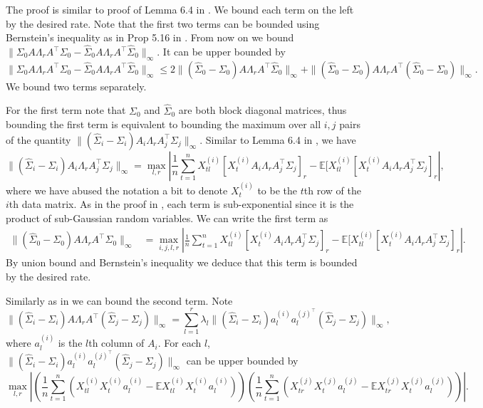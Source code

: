 \documentclass[11pt]{article}
\newcommand{\so}{\widehat{\Sigma}_0}
\newcommand{\0}{{\mathbf{0}}}
\begin{document}
\iffalse
The proof is similar to proof of Lemma 6.4 in \cite{gao2017sparse}. We bound each term on the left by the desired rate. Note that the first two terms can be bounded using Bernstein's inequality as in Prop 5.16 in \cite{vershynin2010introduction}. From now on we bound $\|\Sigma_0A\Lambda_rA^\top\Sigma_0-\so A\Lambda_r A^\top\so\|_\infty.$ It can be upper bounded by
\begin{equation*}
\|\Sigma_0A\Lambda_rA^\top\Sigma_0-\so A\Lambda_r A^\top\so\|_\infty\leq 2\|(\so-\Sigma_0)A\Lambda_rA^\top\so\|_\infty+\|(\so-\Sigma_0)A\Lambda_rA^\top(\so-\Sigma_0)\|_\infty.
\end{equation*}
We bound two terms separately. 
\par For the first term note that $\Sigma_0$ and $\widehat{\Sigma}_0$ are both block diagonal matrices, thus bounding the first term is equivalent to bounding the maximum over all $i,j$ pairs of the quantity $ \|(\widehat{\Sigma}_i-\Sigma_i)A_i\Lambda_rA_j^\top  \Sigma_j\|_\infty$. Similar to Lemma 6.4 in \cite{gao2017sparse}, we have \begin{equation*}
    \|(\widehat{\Sigma}_i-\Sigma_i)A_i\Lambda_rA_j^\top  \Sigma_j\|_\infty=\max_{l,r}|\frac{1}{n}\sum_{t=1}^n X_{tl}^{(i)}[X^{(i)}_tA_i\Lambda_rA_j^\top  \Sigma_j]_r-\mathbb{E}[ X_{tl}^{(i)}[X^{(i)}_tA_i\Lambda_rA_j^\top  \Sigma_j]_r|,
\end{equation*}
where we have abused the notation a bit to denote $X_t^{(i)}$ to be the $t$th row of the $i$th data matrix. As in the proof in \cite{gao2017sparse}, each term is sub-exponential since it is the product of sub-Gaussian random variables. We can write the first term as \begin{align*}
    \|(\widehat{\Sigma}_0-\Sigma_0)A\Lambda_rA^\top  \Sigma_0\|_{\infty} &=\max_{i,j,l,r}\left|\frac{1}{n}\sum_{t=1}^n X_{tl}^{(i)}[X^{(i)}_tA_i\Lambda_rA_j^\top  \Sigma_j]_r-\mathbb{E}[ X_{tl}^{(i)}[X^{(i)}_tA_i\Lambda_rA_j^\top  \Sigma_j]_r\right|.
\end{align*}
By union bound and Bernstein's inequality we deduce that this term is bounded by the desired rate.
\par Similarly as in \cite{gao2017sparse} we can bound the second term. Note\begin{equation*}
    \|(\widehat{\Sigma}_i-\Sigma_i)A\Lambda_rA^\top  (\widehat{\Sigma}_j-\Sigma_j)\|_\infty = \sum_{l=1}^r \lambda_l\|(\widehat{\Sigma}_i-\Sigma_i)a_l^{(i)}a_l^{(j)^\top}  (\widehat{\Sigma}_j-\Sigma_j)\|_\infty,\end{equation*}
    where $a_l^{(i)}$ is the $l$th column of $A_i$. For each $l$, $\|(\widehat{\Sigma}_i-\Sigma_i)a_l^{(i)}a_l^{(j)^\top} (\widehat{\Sigma}_j-\Sigma_j)\|_\infty$ can be upper bounded by\begin{equation*}
\max_{l,r}\left|\left(\frac{1}{n}\sum_{t=1}^n (X_{tl}^{(i)}X_t^{(i)} a_l^{(i)}-\mathbb{E}X_{tl}^{(i)}X_t^{(i)} a_l^{(i)})\right)\left(\frac{1}{n}\sum_{t=1}^n (X_{tr}^{(j)}X_t^{(j)} a_l^{(j)}-\mathbb{E}X_{tr}^{(j)}X_t^{(j)} a_l^{(j)})\right)\right|.
    \end{equation*}
\end{document}

